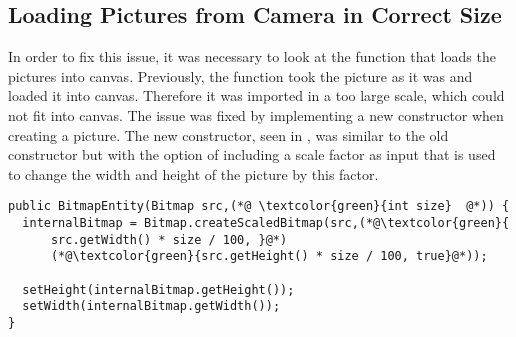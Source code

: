 \subsection{Loading Pictures from Camera in Correct Size}
In order to fix this issue, it was necessary to look at the function that loads the pictures into canvas.
Previously, the function took the picture as it was and loaded it into canvas.
Therefore it was imported in a too large scale, which could not fit into canvas.
The issue was fixed by implementing a new constructor when creating a picture.
The new constructor, seen in , was similar to the old constructor but with the option of including a scale factor as input that is used to change the width and height of the picture by this factor.

\begin{lstlisting}[caption={New Constructor for \textit{BitmapEntity}}, label=lst:BitmapEnity-Constructor-New, float=h]
public BitmapEntity(Bitmap src,(*@ \textcolor{green}{int size}  @*)) {
  internalBitmap = Bitmap.createScaledBitmap(src,(*@\textcolor{green}{
      src.getWidth() * size / 100, }@*)
      (*@\textcolor{green}{src.getHeight() * size / 100, true}@*));
  
  setHeight(internalBitmap.getHeight());
  setWidth(internalBitmap.getWidth());
}
\end{lstlisting}
